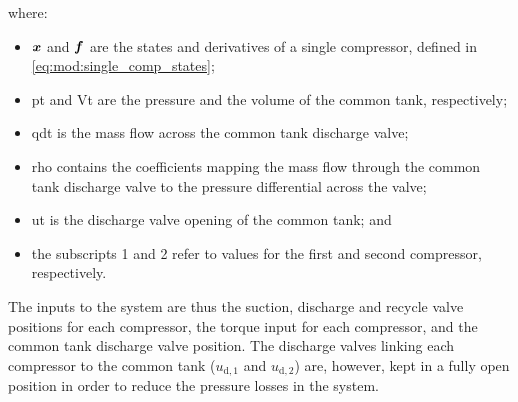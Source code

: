 where:

\begin{itemize}
  \item $\bm{x}$ and $\bm{f}$ are the states and derivatives of a single compressor, defined in \eqref{eq:mod:single_comp_states};
  \item \gls{pt} and \gls{Vt} are the pressure and the volume of the common tank, respectively;
  \item \gls{qdt} is the mass flow across the common tank discharge valve;
  \item \gls{rho} contains the coefficients mapping the mass flow through the common tank discharge valve to the pressure differential across the valve;
  \item \gls{ut} is the discharge valve opening of the common tank; and
  \item the subscripts 1 and 2 refer to values for the first and second compressor, respectively.
\end{itemize}

The inputs to the system are thus the suction, discharge and recycle valve positions for each compressor, the torque input for each compressor, and the common tank discharge valve position.
The discharge valves linking each compressor to the common tank ($u_{\text{d},1}$ and $u_{\text{d},2}$) are, however, kept in a fully open position in order to reduce the pressure losses in the system.

